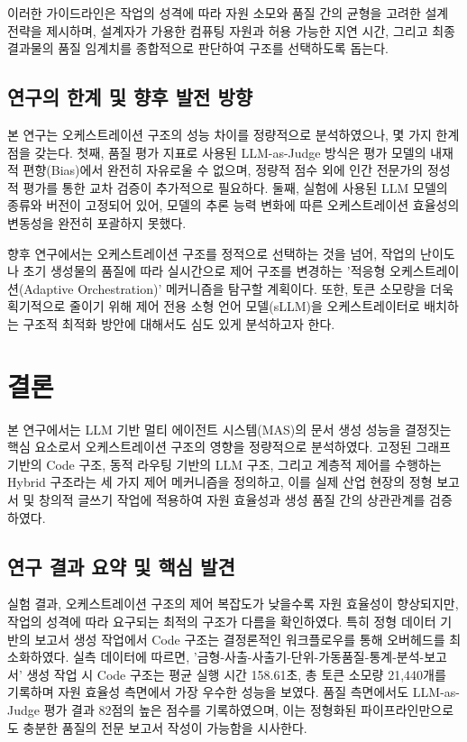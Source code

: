 \documentclass[10pt,twocolumn]{article}
\begin{document}
이러한 가이드라인은 작업의 성격에 따라 자원 소모와 품질 간의 균형을 고려한 설계 전략을 제시하며, 설계자가 가용한 컴퓨팅 자원과 허용 가능한 지연 시간, 그리고 최종 결과물의 품질 임계치를 종합적으로 판단하여 구조를 선택하도록 돕는다.

\subsection{연구의 한계 및 향후 발전 방향}

본 연구는 오케스트레이션 구조의 성능 차이를 정량적으로 분석하였으나, 몇 가지 한계점을 갖는다. 첫째, 품질 평가 지표로 사용된 LLM-as-Judge 방식은 평가 모델의 내재적 편향(Bias)에서 완전히 자유로울 수 없으며, 정량적 점수 외에 인간 전문가의 정성적 평가를 통한 교차 검증이 추가적으로 필요하다. 둘째, 실험에 사용된 LLM 모델의 종류와 버전이 고정되어 있어, 모델의 추론 능력 변화에 따른 오케스트레이션 효율성의 변동성을 완전히 포괄하지 못했다.

향후 연구에서는 오케스트레이션 구조를 정적으로 선택하는 것을 넘어, 작업의 난이도나 초기 생성물의 품질에 따라 실시간으로 제어 구조를 변경하는 '적응형 오케스트레이션(Adaptive Orchestration)' 메커니즘을 탐구할 계획이다. 또한, 토큰 소모량을 더욱 획기적으로 줄이기 위해 제어 전용 소형 언어 모델(sLLM)을 오케스트레이터로 배치하는 구조적 최적화 방안에 대해서도 심도 있게 분석하고자 한다.



\section{결론}
본 연구에서는 LLM 기반 멀티 에이전트 시스템(MAS)의 문서 생성 성능을 결정짓는 핵심 요소로서 오케스트레이션 구조의 영향을 정량적으로 분석하였다. 고정된 그래프 기반의 Code 구조, 동적 라우팅 기반의 LLM 구조, 그리고 계층적 제어를 수행하는 Hybrid 구조라는 세 가지 제어 메커니즘을 정의하고, 이를 실제 산업 현장의 정형 보고서 및 창의적 글쓰기 작업에 적용하여 자원 효율성과 생성 품질 간의 상관관계를 검증하였다.

\subsection{연구 결과 요약 및 핵심 발견}

실험 결과, 오케스트레이션 구조의 제어 복잡도가 낮을수록 자원 효율성이 향상되지만, 작업의 성격에 따라 요구되는 최적의 구조가 다름을 확인하였다. 특히 정형 데이터 기반의 보고서 생성 작업에서 Code 구조는 결정론적인 워크플로우를 통해 오버헤드를 최소화하였다. 실측 데이터에 따르면, '금형-사출-사출기-단위-가동품질-통계-분석-보고서' 생성 작업 시 Code 구조는 평균 실행 시간 158.61초, 총 토큰 소모량 21,440개를 기록하며 자원 효율성 측면에서 가장 우수한 성능을 보였다. 품질 측면에서도 LLM-as-Judge 평가 결과 82점의 높은 점수를 기록하였으며, 이는 정형화된 파이프라인만으로도 충분한 품질의 전문 보고서 작성이 가능함을 시사한다.
\end{document}
